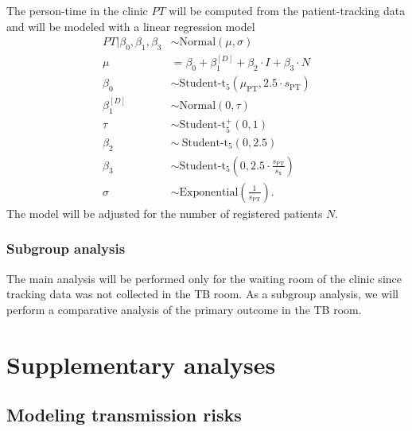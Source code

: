 \documentclass{article}
\begin{document}
The person-time in the clinic $PT$ will be computed from the patient-tracking data and will be modeled with a linear regression model 
\begin{align*}
    PT | \beta_0, \beta_1, \beta_3 &\sim \text{Normal}(\mu, \sigma) \\
    \mu &= \beta_0 + \beta_1^{[D]} + \beta_2 \cdot I + \beta_3 \cdot N \\
    \beta_0 &\sim \text{Student-t}_5(\mu_{\text{PT}}, 2.5\cdot s_{\text{PT}}) \\
    \beta_1^{[D]} &\sim \text{Normal}(0, \tau) \\
    \tau &\sim \text{Student-t}_5^{+}(0, 1) \\
    \beta_2 &\sim ~\text{Student-t}_5(0, 2.5) \\
    \beta_3 &\sim \text{Student-t}_5\left(0, 2.5\cdot \frac{s_{\text{PT}}}{s_{\text{x}}}\right) \\
    \sigma &\sim \text{Exponential}\left(\frac{1}{s_{\text{PT}}}\right).
\end{align*}
The model will be adjusted for the number of registered patients $N$.

\subsubsection{Subgroup analysis}

The main analysis will be performed only for the waiting room of the clinic since tracking data was not collected in the TB room. As a subgroup analysis, we will perform a comparative analysis of the primary outcome in the TB room. 

\section{Supplementary analyses}



\subsection{Modeling transmission risks}
\end{document}
